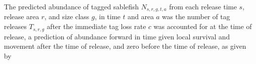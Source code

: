\documentclass{article}
\begin{document}
The predicted abundance of tagged sablefish $N_{s, r, g, t, a}$ from each release time $s$, release area $r$, and size class $g$, in time $t$ and area $a$ was the number of tag releases $T_{s, r, g}$ after the immediate tag loss rate $c$ was accounted for at the time of release, a prediction of abundance forward in time given local survival and movement after the time of release, and zero before the time of release, as given by
% 
\end{document}

